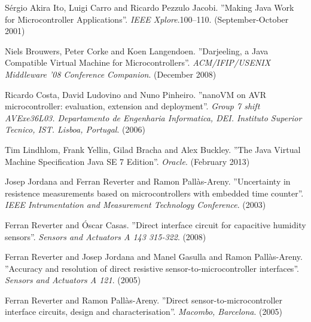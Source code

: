 \documentclass[english,final]{EETAC_TFC}
\begin{document}
\cleardoublepage
{}
\begin{thebibliography}{2}



Sérgio Akira Ito, Luigi Carro and Ricardo Pezzulo Jacobi.
''Making Java Work for Microcontroller Applications''. {\it IEEE Xplore}.100--110. (September-October 2001)

Niels Brouwers, Peter Corke and Koen Langendoen.
''Darjeeling, a Java Compatible Virtual Machine for Microcontrollers''. {\it ACM/IFIP/USENIX Middleware '08 Conference Companion}. (December 2008)

Ricardo Costa, David Ludovino and Nuno Pinheiro.
''nanoVM on AVR microcontroller: evaluation, extension and deployment''. {\it Group 7 shift AVExe36L03. Departamento de Engenharia Informatica, DEI. Instituto Superior Tecnico, IST. Lisboa, Portugal}. (2006)

Tim Lindhlom, Frank Yellin, Gilad Bracha and Alex Buckley.
''The Java Virtual Machine Specification Java SE 7 Edition''. {\it Oracle}. (February 2013)

Josep Jordana and Ferran Reverter and Ramon Pallàs-Areny.
''Uncertainty in resistence measurements based on microcontrollers with embedded time counter''. {\it IEEE Intrumentation and Measurement Technology Conference}. (2003)

Ferran Reverter and Óscar Casas.
''Direct interface circuit for capacitive humidity sensors''. {\it Sensors and Actuators A 143 315-322}. (2008)

Ferran Reverter and Josep Jordana and Manel Gasulla and Ramon Pallàs-Areny.
''Accuracy and resolution of direct resistive sensor-to-microcontroller interfaces''. {\it Sensors and Actuators A 121}. (2005)

Ferran Reverter and Ramon Pallàs-Areny.
''Direct sensor-to-microcontroller interface circuits, design and characterisation''. {\it Macombo, Barcelona}. (2005)


\end{thebibliography}
\end{document}
